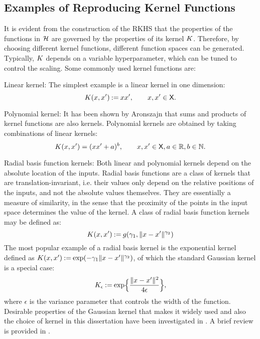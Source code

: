 
\subsection{Examples of Reproducing Kernel Functions}
It is evident from the construction of the RKHS that the properties of the functions in ${\cal H}$ are governed by the properties of its kernel $K$. Therefore, by choosing different kernel functions, different function spaces can be generated. Typically, $K$ depends on a variable hyperparameter, which can be tuned to control the scaling. Some commonly used kernel functions are:
\begin{arabnum}
\item Linear kernel: The simplest example is a linear kernel in one dimension:
\begin{equation}
K(x,x') \mathbin{:=} x x', \qquad x,x' \in {\sf X}.
\end{equation}
\item Polynomial kernel: It has been shown by Aronszajn \cite{aro50} that sums and products of kernel functions are also kernels. Polynomial kernels are obtained by taking combinations of linear kernels:
\begin{equation}
K(x,x') = (xx' + a)^b, \qquad x,x'\in {\sf X}, a \in \mathbb{R}, b \in \mathbb{N}.
\end{equation}
\item Radial basis function kernels: Both linear and polynomial kernels depend on the absolute location of the inputs. Radial basis functions are a class of kernels that are translation-invariant, i.e. their values only depend on the relative positions of the inputs, and not the absolute values themselves. They are essentially a measure of similarity, in the sense that the proximity of the points in the input space determines the value of the kernel. A class of radial basis function kernels may be defined as:
\begin{equation}
K(x,x') \mathbin{:=} g(\gamma_1, \|x-x'\|^{\gamma_2})
\end{equation}  
The most popular example of a radial basis kernel is the exponential kernel defined as $K(x,x') \mathbin{:=} \exp(-\gamma_1 \|x - x'\|^{\gamma_2})$, of which the standard Gaussian kernel is a special case:
\begin{equation}
\Kern_\epsilon \eqdef \exp\Bigl\{\frac{\|x-x'\|^2}{4 \epsilon}\Bigr\},
\label{e:rkhs_gaussian_kernel}
\end{equation}
where $\epsilon$ is the variance parameter that controls the width of the function. Desirable properties of the Gaussian kernel that makes it widely used and also the choice of kernel in this dissertation have been investigated in \cite{min10,stehussco06}. A brief review is provided in . 
\end{arabnum}

